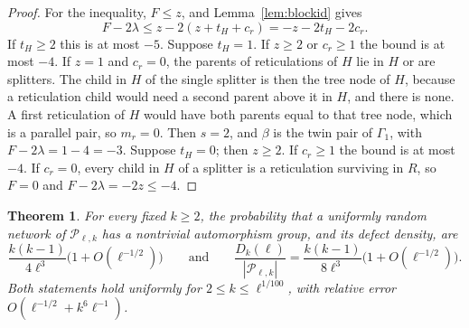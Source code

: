 \documentclass[11pt,a4paper]{article}
\newtheorem{theorem}{Theorem}[section]
\theoremstyle{definition}
\newcommand{\cP}{\mathcal{P}}
\begin{document}
\begin{proof}
For the inequality, $F\le z$, and Lemma~\ref{lem:blockid} gives
\[
F-2\lambda\le z-2(z+t_H+c_r)=-z-2t_H-2c_r .
\]
If $t_H\ge2$ this is at most $-5$. Suppose $t_H=1$. If $z\ge2$ or $c_r\ge1$ the bound is at most $-4$. If $z=1$ and $c_r=0$, the parents of reticulations of $H$ lie in $H$ or are splitters. The child in $H$ of the single splitter is then the tree node of $H$, because a reticulation child would need a second parent above it in $H$, and there is none. A first reticulation of $H$ would have both parents equal to that tree node, which is a parallel pair, so $m_r=0$. Then $s=2$, and $\beta$ is the twin pair of $\Gamma_1$, with $F-2\lambda=1-4=-3$. Suppose $t_H=0$; then $z\ge2$. If $c_r\ge1$ the bound is at most $-4$. If $c_r=0$, every child in $H$ of a splitter is a reticulation surviving in $R$, so $F=0$ and $F-2\lambda=-2z\le-4$.
\end{proof}


\begin{theorem}\label{thm:symlaw}
For every fixed $k\ge2$, the probability that a uniformly random network of $\cP_{\ell,k}$ has a nontrivial automorphism group, and its defect density, are
\begin{equation}\label{eq:symlaw}
\frac{k(k-1)}{4\ell^3}\bigl(1+O(\ell^{-1/2})\bigr)\qquad\text{and}\qquad\frac{D_k(\ell)}{|\cP_{\ell,k}|}=\frac{k(k-1)}{8\ell^3}\bigl(1+O(\ell^{-1/2})\bigr).
\end{equation}
Both statements hold uniformly for $2\le k\le\ell^{1/100}$, with relative error $O(\ell^{-1/2}+k^6\ell^{-1})$.
\end{theorem}
\end{document}
